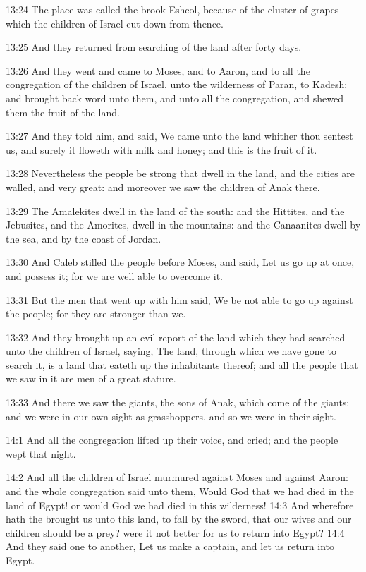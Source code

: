 13:24 The place was called the brook Eshcol, because of the cluster of
grapes which the children of Israel cut down from thence.

13:25 And they returned from searching of the land after forty days.

13:26 And they went and came to Moses, and to Aaron, and to all the
congregation of the children of Israel, unto the wilderness of Paran,
to Kadesh; and brought back word unto them, and unto all the
congregation, and shewed them the fruit of the land.

13:27 And they told him, and said, We came unto the land whither thou
sentest us, and surely it floweth with milk and honey; and this is the
fruit of it.

13:28 Nevertheless the people be strong that dwell in the land, and
the cities are walled, and very great: and moreover we saw the
children of Anak there.

13:29 The Amalekites dwell in the land of the south: and the Hittites,
and the Jebusites, and the Amorites, dwell in the mountains: and the
Canaanites dwell by the sea, and by the coast of Jordan.

13:30 And Caleb stilled the people before Moses, and said, Let us go
up at once, and possess it; for we are well able to overcome it.

13:31 But the men that went up with him said, We be not able to go up
against the people; for they are stronger than we.

13:32 And they brought up an evil report of the land which they had
searched unto the children of Israel, saying, The land, through which
we have gone to search it, is a land that eateth up the inhabitants
thereof; and all the people that we saw in it are men of a great
stature.

13:33 And there we saw the giants, the sons of Anak, which come of the
giants: and we were in our own sight as grasshoppers, and so we were
in their sight.

14:1 And all the congregation lifted up their voice, and cried; and
the people wept that night.

14:2 And all the children of Israel murmured against Moses and against
Aaron: and the whole congregation said unto them, Would God that we
had died in the land of Egypt! or would God we had died in this
wilderness!  14:3 And wherefore hath the \LORD brought us unto this
land, to fall by the sword, that our wives and our children should be
a prey? were it not better for us to return into Egypt?  14:4 And they
said one to another, Let us make a captain, and let us return into
Egypt.

